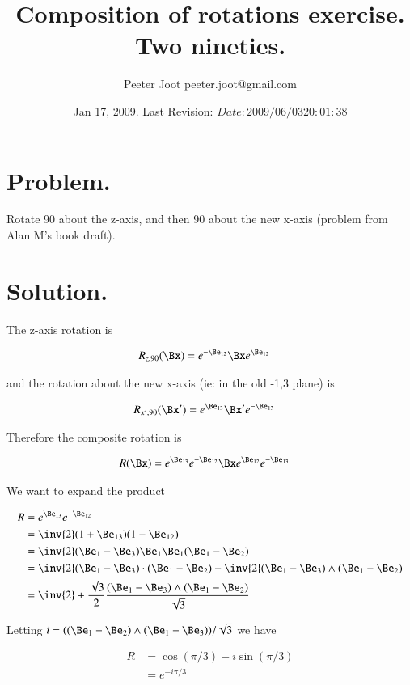 \documentclass{article}
\title{ Composition of rotations exercise.  Two nineties. }
\author{Peeter Joot \quad peeter.joot@gmail.com}
\date{ Jan 17, 2009.  Last Revision: $Date: 2009/06/03 20:01:38 $ }
\begin{document}
\maketitle{}
\section{Problem. }

Rotate 90 about the z-axis, and then 90 about the new x-axis (problem from Alan M's book draft).

\section{Solution. }

The z-axis rotation is 

\begin{align*}
R_{z,90}(\Bx) &= e^{-\Be_{12}} \Bx e^{\Be_{12}}
\end{align*}

and the rotation about the new x-axis (ie: in the old -1,3 plane) is

\begin{align*}
R_{x',90}(\Bx') &= e^{\Be_{13}} \Bx' e^{-\Be_{13}}
\end{align*}

Therefore the composite rotation is

\begin{align*}
R(\Bx) &= e^{\Be_{13}} e^{-\Be_{12}} \Bx e^{\Be_{12}} e^{-\Be_{13}}
\end{align*}

We want to expand the product

\begin{align*}
R 
&= e^{\Be_{13}} e^{-\Be_{12}} \\
&= \inv{2} (1 + \Be_{13}) (1 - \Be_{12}) \\
&= \inv{2} (\Be_1 - \Be_{3}) \Be_1 \Be_1 (\Be_1 - \Be_{2}) \\
&= \inv{2} (\Be_1 - \Be_{3}) \cdot (\Be_1 - \Be_{2}) +\inv{2} (\Be_1 - \Be_{3}) \wedge (\Be_1 - \Be_{2}) \\
&= \inv{2} + \frac{\sqrt{3}}{2} \frac{(\Be_1 - \Be_{3}) \wedge (\Be_1 - \Be_{2})}{\sqrt{3}} \\
\end{align*}

Letting $i = ((\Be_1 - \Be_{2}) \wedge (\Be_1 - \Be_{3}))/\sqrt{3}$ we have

\begin{align*}
R 
&= \cos(\pi/3) - i\sin(\pi/3) \\
&= e^{-i \pi/3}
\end{align*}
\end{document}
